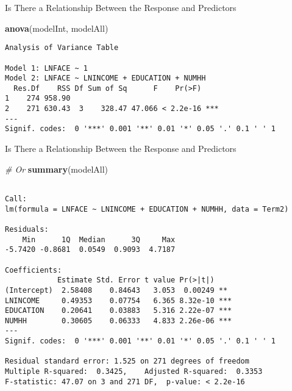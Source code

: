 \documentclass[
  ignorenonframetext,
]{beamer}
\newenvironment{Shaded}{\begin{snugshade}}{\end{snugshade}}
\newcommand{\CommentTok}[1]{\textcolor[rgb]{0.56,0.35,0.01}{\textit{#1}}}
\newcommand{\FunctionTok}[1]{\textcolor[rgb]{0.13,0.29,0.53}{\textbf{#1}}}
\newcommand{\NormalTok}[1]{#1}
\begin{document}
\begin{frame}[fragile]{Is There a Relationship Between the Response and
Predictors}
\protect\hypertarget{is-there-a-relationship-between-the-response-and-predictors-2}{}
\normalsize

\begin{Shaded}
\begin{Highlighting}[]
\FunctionTok{anova}\NormalTok{(modelInt, modelAll)}
\end{Highlighting}
\end{Shaded}

\begin{verbatim}
Analysis of Variance Table

Model 1: LNFACE ~ 1
Model 2: LNFACE ~ LNINCOME + EDUCATION + NUMHH
  Res.Df    RSS Df Sum of Sq      F    Pr(>F)    
1    274 958.90                                  
2    271 630.43  3    328.47 47.066 < 2.2e-16 ***
---
Signif. codes:  0 '***' 0.001 '**' 0.01 '*' 0.05 '.' 0.1 ' ' 1
\end{verbatim}

\normalsize
\end{frame}

\begin{frame}[fragile]{Is There a Relationship Between the Response and
Predictors}
\protect\hypertarget{is-there-a-relationship-between-the-response-and-predictors-3}{}
\scriptsize

\begin{Shaded}
\begin{Highlighting}[]
\CommentTok{\# Or}
\FunctionTok{summary}\NormalTok{(modelAll)}
\end{Highlighting}
\end{Shaded}

\begin{verbatim}

Call:
lm(formula = LNFACE ~ LNINCOME + EDUCATION + NUMHH, data = Term2)

Residuals:
    Min      1Q  Median      3Q     Max 
-5.7420 -0.8681  0.0549  0.9093  4.7187 

Coefficients:
            Estimate Std. Error t value Pr(>|t|)    
(Intercept)  2.58408    0.84643   3.053  0.00249 ** 
LNINCOME     0.49353    0.07754   6.365 8.32e-10 ***
EDUCATION    0.20641    0.03883   5.316 2.22e-07 ***
NUMHH        0.30605    0.06333   4.833 2.26e-06 ***
---
Signif. codes:  0 '***' 0.001 '**' 0.01 '*' 0.05 '.' 0.1 ' ' 1

Residual standard error: 1.525 on 271 degrees of freedom
Multiple R-squared:  0.3425,    Adjusted R-squared:  0.3353 
F-statistic: 47.07 on 3 and 271 DF,  p-value: < 2.2e-16
\end{verbatim}

\normalsize
\end{frame}
\end{document}
